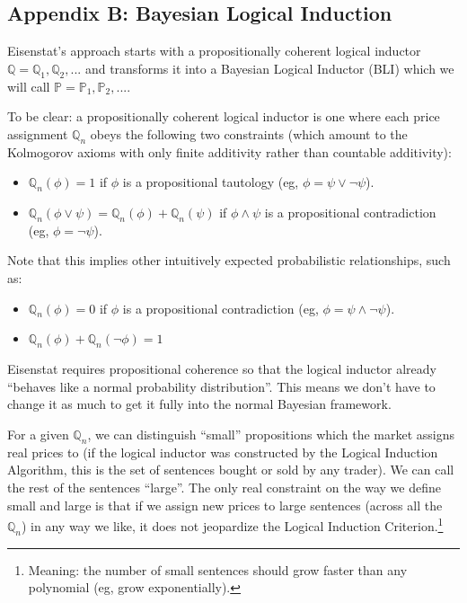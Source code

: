 \documentclass{article}
\begin{document}
\subsection*{Appendix B: Bayesian Logical Induction}

Eisenstat's approach starts with a propositionally coherent logical inductor $\mathbb{Q}=\mathbb{Q}_1, \mathbb{Q}_2,...$ and transforms it into a Bayesian Logical Inductor (BLI) which we will call $\mathbb{P}=\mathbb{P}_1, \mathbb{P}_2, ...$. 

To be clear: a propositionally coherent logical inductor is one where each price assignment $\mathbb{Q}_n$ obeys the following two constraints (which amount to the Kolmogorov axioms with only finite additivity rather than countable additivity):

\begin{itemize}
  \item $\mathbb{Q}_n(\phi)=1$ if $\phi$ is a propositional tautology (eg, $\phi=\psi\vee\neg\psi$).
  \item $\mathbb{Q}_n(\phi\vee\psi)=\mathbb{Q}_n(\phi)+\mathbb{Q}_n(\psi)$ if $\phi\wedge\psi$ is a propositional contradiction (eg, $\phi=\neg\psi$).
\end{itemize}

Note that this implies other intuitively expected probabilistic relationships, such as: 
\begin{itemize}
  \item $\mathbb{Q}_n(\phi)=0$ if $\phi$ is a propositional contradiction (eg, $\phi=\psi\wedge\neg\psi$).
  \item $\mathbb{Q}_n(\phi)+\mathbb{Q}_n(\neg\phi)=1$
\end{itemize}

Eisenstat requires propositional coherence so that the logical inductor already ``behaves like a normal probability distribution''. This means we don't have to change it as much to get it fully into the normal Bayesian framework.

For a given $\mathbb{Q}_n$, we can distinguish ``small'' propositions which the market assigns real prices to (if the logical inductor was constructed by the Logical Induction Algorithm, this is the set of sentences bought or sold by any trader). We can call the rest of the sentences ``large''. The only real constraint on the way we define small and large is that if we assign new prices to large sentences (across all the $\mathbb{Q}_n$) in any way we like, it does not jeopardize the Logical Induction Criterion.\footnote{Meaning: the number of small sentences should grow faster than any polynomial (eg, grow exponentially).}
\end{document}
